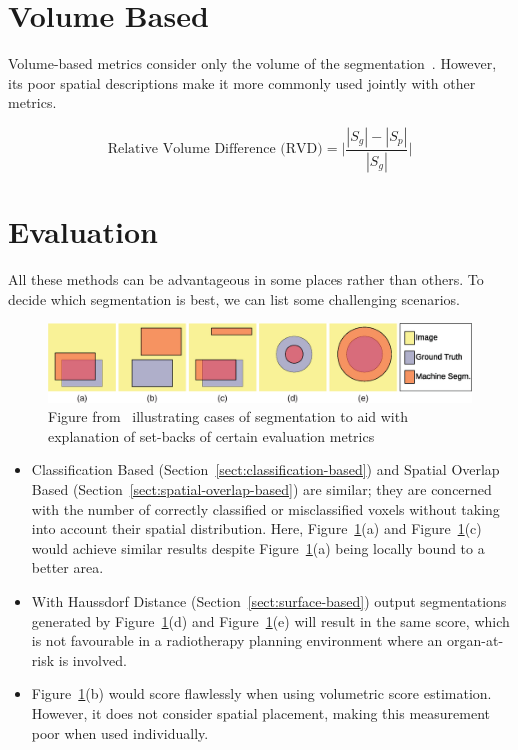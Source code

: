 \documentclass[11pt,twoside]{report}
\begin{document}
\section{Volume Based}

Volume-based metrics consider only the volume of the segmentation~\cite{evaluation-of-metrics-in-prostate,review-metrics, boundary-overlap-metrics}. However, its poor spatial descriptions make it more commonly used jointly with other metrics.

\begin{equation*}
 \text{Relative Volume Difference (RVD)} = \bigg| \frac{|S_g|-|S_p|}{|S_g|}\bigg|
\end{equation*}

\section{Evaluation}\label{sect:evaluation-of-evaluation-methods}

All these methods can be advantageous in some places rather than others. To decide which segmentation is best, we can list some challenging scenarios.

\begin{figure}[H]
  \centering
  \includegraphics[width=\linewidth]{../figures/segmentation-cases-1.png}
  \caption{Figure from~\cite{boundary-overlap-metrics} illustrating cases of segmentation to aid with explanation of set-backs of certain evaluation metrics}\label{fig:segmentation-cases-1}
\end{figure}

\begin{itemize}
  \item Classification Based (Section~\ref{sect:classification-based}) and Spatial Overlap Based (Section~\ref{sect:spatial-overlap-based}) are similar; they are concerned with the number of correctly classified or misclassified voxels without taking into account their spatial distribution. Here, Figure~\ref{fig:segmentation-cases-1}(a) and Figure~\ref{fig:segmentation-cases-1}(c) would achieve similar results despite Figure~\ref{fig:segmentation-cases-1}(a) being locally bound to a better area.
  \item With Haussdorf Distance (Section~\ref{sect:surface-based}) output segmentations generated by Figure~\ref{fig:segmentation-cases-1}(d) and Figure~\ref{fig:segmentation-cases-1}(e) will result in the same score, which is not favourable in a radiotherapy planning environment where an organ-at-risk is involved.
  \item Figure~\ref{fig:segmentation-cases-1}(b) would score flawlessly when using volumetric score estimation. However, it does not consider spatial placement, making this measurement poor when used individually.
\end{itemize}
\end{document}
